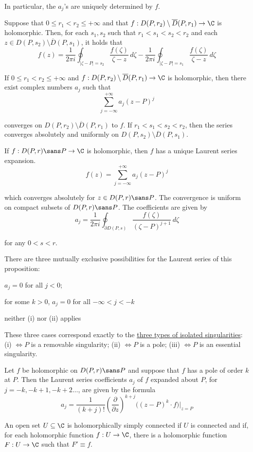 In particular, the $a_j$'s are uniquely determined by $f$.

\label{ca5d89e}

Suppose that $0\leq r_1<r_2\leq+\infty$ and that $f:D(P,r_2)\setminus\overline
D(P,r_1)\to\C$ is holomorphic. Then, for each $s_1,s_2$ such that
$r_1<s_1<s_2<r_2$ and each $z\in D(P,s_2)\setminus\overline D(P,s_1)$, it holds
that
$$
  f(z)=\frac1{2\pi i}\oint_{|\zeta-P|=s_2}\frac{f(\zeta)}{\zeta-z}\,d\zeta
  -\frac1{2\pi i}\oint_{|\zeta-P|=s_1}\frac{f(\zeta)}{\zeta-z}\,d\zeta
$$

\label{cd93e84}

If $0\leq r_1<r_2\leq+\infty$ and $f:D(P,r_2)\setminus\overline D(P,r_1)\to\C$
is holomorphic, then there exist complex numbers $a_j$ such that
$$
  \sum_{j=-\infty}^{+\infty}a_j(z-P)^j
$$

converges on $D(P,r_2)\setminus\overline D(P,r_1)$ to $f$. If
$r_1<s_1<s_2<r_2$, then the series converges absolutely and uniformly on
$D(P,s_2)\setminus\overline D(P,s_1)$.

\label{e7fa5f8}

If $f:D(P,r)\sans P\to\C$ is holomorphic, then $f$ has a unique Laurent series
expansion.
$$
  f(z)=\sum_{j=-\infty}^{+\infty}a_j(z-P)^j
$$

which converges absolutely for $z\in D(P,r)\sans P$. The convergence is uniform
on compact subsets of $D(P,r)\sans P$. The coefficients are given by
$$
  a_j=\frac1{2\pi i}\oint_{\partial D(P,s)}\frac{f(\zeta)}{(\zeta-P)^{j+1}}\,d\zeta
$$

for any $0<s<r$.

There are three mutually exclusive possibilities for the Laurent series of this
proposition:
\begin{enumerati}
  \item $a_j=0$ for all $j<0$;
  \item for some $k>0$, $a_j=0$ for all $-\infty<j<-k$
  \item neither (i) nor (ii) applies
\end{enumerati}

These three cases correspond exactly to the \href{a7f062e}{three types of
isolated singularities}: (i) $\iff P$ is a removable singularity; (ii) $\iff P$
is a pole; (iii) $\iff P$ is an essential singularity.

\label{c1d2d0c}

Let $f$ be holomorphic on $D(P,r)\sans P$ and suppose that $f$ has a pole of
order $k$ at $P$. Then the Laurent series coefficients $a_j$ of $f$ expanded
about $P$, for $j=-k,-k+1,-k+2\ldots$, are given by the formula
$$
  a_j=\frac1{(k+j)!}\left(\frac\partial{\partial z}\right)^{k+j}
  \big((z-P)^k\cdot f\big)\Bigg|_{z=P}
$$

\label{d20898f}

An open set $U\subseteq\C$ is holomorphically simply connected if $U$ is
connected and if, for each holomorphic function $f:U\to\C$, there is a
holomorphic function $F:U\to\C$ such that $F'\equiv f$.